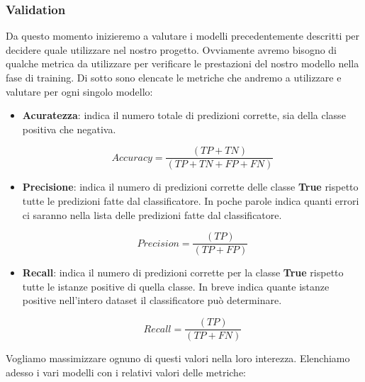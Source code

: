 \documentclass[12pt]{article}
\begin{document}
\subsubsection{Validation}
Da questo momento inizieremo a valutare i modelli precedentemente descritti per decidere quale utilizzare nel nostro progetto.
Ovviamente avremo bisogno di qualche metrica da utilizzare per verificare le prestazioni del nostro modello nella fase di training. Di sotto sono elencate le metriche che andremo a utilizzare e valutare per ogni singolo modello:
\begin{itemize}
    \item \textbf{Acuratezza}: indica il numero totale di predizioni corrette, sia della classe positiva che negativa.\par \[\textit{Accuracy}=\frac{(TP + TN)}{(TP+TN+FP+FN)} \]
    \item \textbf{Precisione}: indica il numero di predizioni corrette delle classe \textbf{True} rispetto tutte le predizioni fatte dal classificatore. In poche parole indica quanti errori ci saranno nella lista delle predizioni fatte dal classificatore.\par \[\textit{Precision}=\frac{(TP)}{(TP+FP)} \]
    \item \textbf{Recall}: indica il numero di predizioni corrette per la classe \textbf{True} rispetto tutte le istanze positive di quella classe. In breve indica quante istanze positive nell'intero dataset il classificatore può determinare.\par \[\textit{Recall}=\frac{(TP)}{(TP+FN)} \]
\end{itemize}
Vogliamo massimizzare ognuno di questi valori nella loro interezza.
Elenchiamo adesso i vari modelli con i relativi valori delle metriche:
\end{document}

